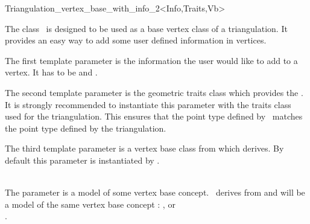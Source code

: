 

\begin{ccRefClass}{Triangulation_vertex_base_with_info_2<Info,Traits,Vb>}  %


\ccDefinition
  
The class \ccRefName\ is designed to be used as a base vertex class
of a triangulation. It provides an easy way to add some user defined information in vertices.


\ccParameters

The first template parameter is the information the user would like to add
to a vertex.  It has to be  and .

The second template parameter is the geometric traits class
which provides the . It is strongly 
recommended to instantiate this parameter
with the traits class used for   the triangulation.
This ensures that the point type defined by \ccRefName\
matches  the point type defined by 
the triangulation.

The third template parameter is a vertex base class from which
 derives.  By default
this parameter is instantiated by
.

\ccIsModel
{}\\
The parameter  is a model of some vertex base concept.
\ccRefName\ derives from \ccc{Vb} and will be a model of the
same vertex base concept :
, or \\
.

\ccTypes
{}



\end{ccRefClass}
